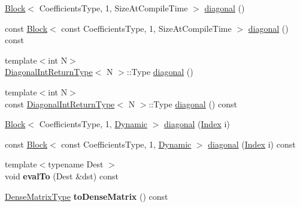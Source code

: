 \begin{DoxyCompactItemize}
\item 
\hyperlink{group___core___module_class_eigen_1_1_block}{Block}$<$ Coefficients\+Type, 1, Size\+At\+Compile\+Time $>$ \hyperlink{class_eigen_1_1internal_1_1_band_matrix_base_abce1c4d69e72ec594f67a841d1040606}{diagonal} ()
\item 
const \hyperlink{group___core___module_class_eigen_1_1_block}{Block}$<$ const Coefficients\+Type, 1, Size\+At\+Compile\+Time $>$ \hyperlink{class_eigen_1_1internal_1_1_band_matrix_base_a7c55438da88b00d29f8f514bddfa86ba}{diagonal} () const
\item 
{\footnotesize template$<$int N$>$ }\\\hyperlink{struct_eigen_1_1internal_1_1_band_matrix_base_1_1_diagonal_int_return_type}{Diagonal\+Int\+Return\+Type}$<$ N $>$\+::Type \hyperlink{class_eigen_1_1internal_1_1_band_matrix_base_a1d98143681d5c1e2709ce18332a939dc}{diagonal} ()
\item 
{\footnotesize template$<$int N$>$ }\\const \hyperlink{struct_eigen_1_1internal_1_1_band_matrix_base_1_1_diagonal_int_return_type}{Diagonal\+Int\+Return\+Type}$<$ N $>$\+::Type \hyperlink{class_eigen_1_1internal_1_1_band_matrix_base_aa8a5c997afb4ebd9b43b9ff2e1078cf9}{diagonal} () const
\item 
\hyperlink{group___core___module_class_eigen_1_1_block}{Block}$<$ Coefficients\+Type, 1, \hyperlink{namespace_eigen_ad81fa7195215a0ce30017dfac309f0b2}{Dynamic} $>$ \hyperlink{class_eigen_1_1internal_1_1_band_matrix_base_a51ce12f0be57b0c2593c20c865de6af1}{diagonal} (\hyperlink{group___core___module_a554f30542cc2316add4b1ea0a492ff02}{Index} i)
\item 
const \hyperlink{group___core___module_class_eigen_1_1_block}{Block}$<$ const Coefficients\+Type, 1, \hyperlink{namespace_eigen_ad81fa7195215a0ce30017dfac309f0b2}{Dynamic} $>$ \hyperlink{class_eigen_1_1internal_1_1_band_matrix_base_a8f7146e80405018d6d0827c4a7713ad3}{diagonal} (\hyperlink{group___core___module_a554f30542cc2316add4b1ea0a492ff02}{Index} i) const
\item 
\mbox{\label{class_eigen_1_1internal_1_1_band_matrix_base_a48c573fc9b58a2d4dd0741b284124a64}} 
{\footnotesize template$<$typename Dest $>$ }\\void {\bfseries eval\+To} (Dest \&dst) const
\item 
\mbox{\label{class_eigen_1_1internal_1_1_band_matrix_base_aacfa0b85201b8503376a9998987f81f7}} 
\hyperlink{group___core___module_class_eigen_1_1_matrix}{Dense\+Matrix\+Type} {\bfseries to\+Dense\+Matrix} () const
\end{DoxyCompactItemize}
